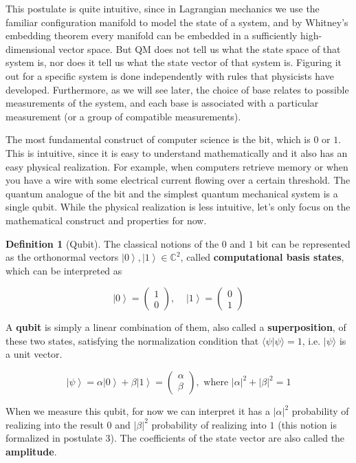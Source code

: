\documentclass{article}
\newcommand{\ket}[1]{\ensuremath{\left|#1\right\rangle}}
\theoremstyle{definition}
\newtheorem{definition}{Definition}[section]
\begin{document}
    This postulate is quite intuitive, since in Lagrangian mechanics we use the familiar configuration manifold to model the state of a system, and by Whitney's embedding theorem every manifold can be embedded in a sufficiently high-dimensional vector space. But QM does not tell us what the state space of that system is, nor does it tell us what the state vector of that system is. Figuring it out for a specific system is done independently with rules that physicists have developed. Furthermore, as we will see later, the choice of base relates to possible measurements of the system, and each base is associated with a particular measurement (or a group of compatible measurements). 
    \par 

    The most fundamental construct of computer science is the bit, which is $0$ or $1$. This is intuitive, since it is easy to understand mathematically and it also has an easy physical realization. For example, when computers retrieve memory or when you have a wire with some electrical current flowing over a certain threshold. The quantum analogue of the bit and the simplest quantum mechanical system is a single qubit. While the physical realization is less intuitive, let's only focus on the mathematical construct and properties for now. 

    \begin{definition}[Qubit]
      The classical notions of the $0$ and $1$ bit can be represented as the orthonormal vectors $\ket{0}, \ket{1} \in \mathbb{C}^2$, called \textbf{computational basis states}, which can be interpreted as 
      
        \[\ket{0} = \begin{pmatrix} 1 \\ 0 \end{pmatrix}, \;\;\;\; \ket{1} = \begin{pmatrix} 0 \\ 1 \end{pmatrix}\]

      A \textbf{qubit} is simply a linear combination of them, also called a \textbf{superposition}, of these two states, satisfying the normalization condition that $\langle \psi | \psi \rangle = 1$, i.e. $|\psi\rangle$ is a unit vector. 

        \[\ket{\psi} = \alpha \ket{0} + \beta \ket{1} = \begin{pmatrix} \alpha \\ \beta \end{pmatrix}, \text{ where } |\alpha|^2 + |\beta|^2 = 1\]

      When we measure this qubit, for now we can interpret it has a $|\alpha|^2$ probability of realizing into the result $0$ and $|\beta|^2$ probability of realizing into $1$ (this notion is formalized in postulate 3). The coefficients of the state vector are also called the \textbf{amplitude}. 
    \end{definition} 
\end{document}
